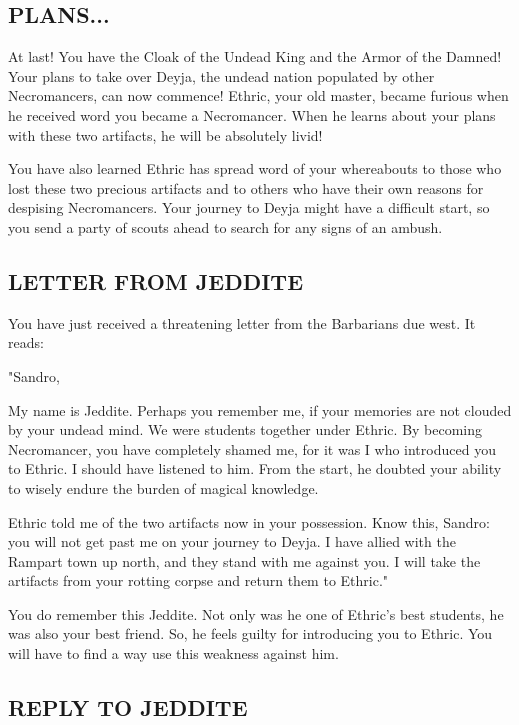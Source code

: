 \begin{multicols*}{2}
\subsection*{\MakeUppercase{Plans...}}

At last! You have the Cloak of the Undead King and the Armor of the Damned! Your plans to take over Deyja, the undead nation populated by other Necromancers, can now commence! Ethric, your old master, became furious when he received word you became a Necromancer. When he learns about your plans with these two artifacts, he will be absolutely livid!

You have also learned Ethric has spread word of your whereabouts to those who lost these two precious artifacts and to others who have their own reasons for despising Necromancers. Your journey to Deyja might have a difficult start, so you send a party of scouts ahead to search for any signs of an ambush.


\subsection*{\MakeUppercase{Letter from Jeddite}}

You have just received a threatening letter from the Barbarians due west. It reads:

\begin{itshape}
"Sandro,

My name is Jeddite. Perhaps you remember me, if your memories are not clouded by your undead mind. We were students together under Ethric. By becoming Necromancer, you have completely shamed me, for it was I who introduced you to Ethric. I should have listened to him. From the start, he doubted your ability to wisely endure the burden of magical knowledge.

Ethric told me of the two artifacts now in your possession. Know this, Sandro: you will not get past me on your journey to Deyja. I have allied with the Rampart town up north, and they stand with me against you. I will take the artifacts from your rotting corpse and return them to Ethric."
\end{itshape}

You do remember this Jeddite. Not only was he one of Ethric's best students, he was also your best friend. So, he feels guilty for introducing you to Ethric. You will have to find a way use this weakness against him.


\subsection*{\MakeUppercase{Reply to Jeddite}}


\end{multicols*}
